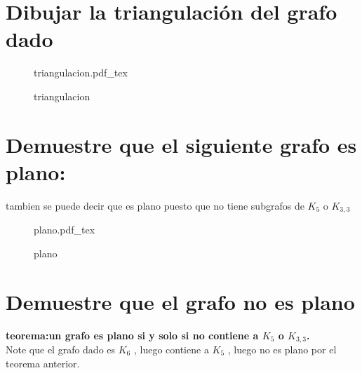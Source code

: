 \documentclass[10pt,a4paper]{article} %
\newcommand{\incfig}[1]{%
    \def\svgwidth{\columnwidth}
    {#1.pdf_tex}
}
\begin{document}
    \section{Dibujar la triangulación del grafo dado}
        \begin{figure}[ht]
            \centering
            \incfig{triangulacion}
            \caption{triangulacion}
            \label{fig:triangulacion}
        \end{figure}

    \newpage
    \section{Demuestre que el siguiente grafo es plano:}
    tambien se puede decir que es plano puesto que no tiene subgrafos de $K_5$ o $K_{3,3}$
    \begin{figure}[ht]
        \centering
        \incfig{plano}
        \caption{plano}
        \label{fig:plano}
    \end{figure}

    \section{Demuestre que el grafo no es plano}
    \textbf{teorema:un grafo es plano si y solo si no contiene a $K_5$ o $K_{3,3}$.}
    \\
    Note que el grafo dado es $K_6$ , luego contiene a $K_5$ , luego no es
    plano por el teorema anterior.
















    \nocite{*}
    
    
\end{document}
